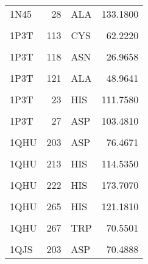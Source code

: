\begin{table}
\begin{tabular}{lrlr}
			\addlinespace
			1N45 & 28 & ALA & 133.1800\\
			\cellcolor{gray!6}{1N45} & \cellcolor{gray!6}{29} & \cellcolor{gray!6}{GLU} & \cellcolor{gray!6}{93.8698}\\
			1P3T & 113 & CYS & 62.2220\\
			\cellcolor{gray!6}{1P3T} & \cellcolor{gray!6}{117} & \cellcolor{gray!6}{SER} & \cellcolor{gray!6}{57.1608}\\
			1P3T & 118 & ASN & 26.9658\\
			\addlinespace
			\cellcolor{gray!6}{1P3T} & \cellcolor{gray!6}{119} & \cellcolor{gray!6}{LEU} & \cellcolor{gray!6}{90.3174}\\
			1P3T & 121 & ALA & 48.9641\\
			\cellcolor{gray!6}{1P3T} & \cellcolor{gray!6}{181} & \cellcolor{gray!6}{PHE} & \cellcolor{gray!6}{104.9100}\\
			1P3T & 23 & HIS & 111.7580\\
			\cellcolor{gray!6}{1P3T} & \cellcolor{gray!6}{26} & \cellcolor{gray!6}{VAL} & \cellcolor{gray!6}{118.5490}\\
			\addlinespace
			1P3T & 27 & ASP & 103.4810\\
			\cellcolor{gray!6}{1QHU} & \cellcolor{gray!6}{171} & \cellcolor{gray!6}{TRP} & \cellcolor{gray!6}{135.3190}\\
			1QHU & 203 & ASP & 76.4671\\
			\cellcolor{gray!6}{1QHU} & \cellcolor{gray!6}{204} & \cellcolor{gray!6}{TYR} & \cellcolor{gray!6}{82.8848}\\
			1QHU & 213 & HIS & 114.5350\\
			\addlinespace
			\cellcolor{gray!6}{1QHU} & \cellcolor{gray!6}{214} & \cellcolor{gray!6}{ARG} & \cellcolor{gray!6}{137.0270}\\
			1QHU & 222 & HIS & 173.7070\\
			\cellcolor{gray!6}{1QHU} & \cellcolor{gray!6}{225} & \cellcolor{gray!6}{GLU} & \cellcolor{gray!6}{167.2860}\\
			1QHU & 265 & HIS & 121.1810\\
			\cellcolor{gray!6}{1QHU} & \cellcolor{gray!6}{266} & \cellcolor{gray!6}{SER} & \cellcolor{gray!6}{59.3970}\\
			\addlinespace
			1QHU & 267 & TRP & 70.5501\\
			\cellcolor{gray!6}{1QJS} & \cellcolor{gray!6}{171} & \cellcolor{gray!6}{TRP} & \cellcolor{gray!6}{138.2760}\\
			1QJS & 203 & ASP & 70.4888\\

\end{tabular}
\end{table}
